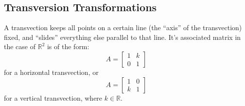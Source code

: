 \subsection{Transversion Transformations}
\begin{definition}
    A transvection keeps all points on a certain line (the “axis” of the transvection) fixed, and “slides” everything else parallel to that line. It's associated matrix in the case of $\mathbb{R}^2$ is of the form:
    \[
        A = \begin{bmatrix}
            1 & k \\
            0 & 1
        \end{bmatrix}
    \]
    for a horizontal transvection, or
    \[
        A = \begin{bmatrix}
            1 & 0 \\
            k & 1
        \end{bmatrix}
    \]
    for a vertical transvection, where $k \in \mathbb{R}$.
\end{definition}
